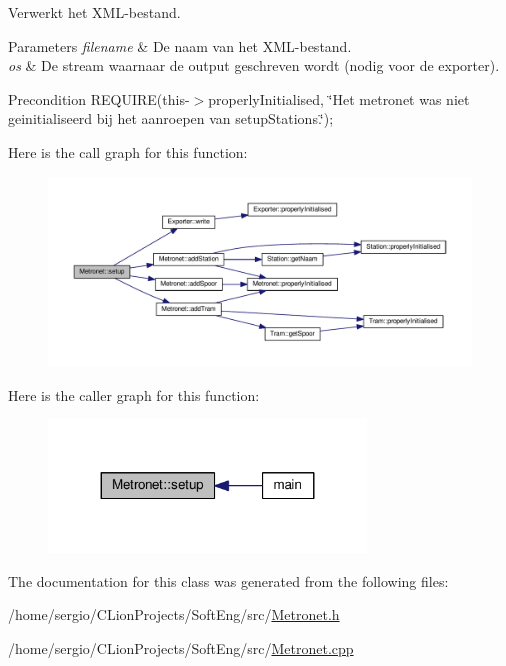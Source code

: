 Verwerkt het X\+M\+L-\/bestand. 


\begin{DoxyParams}{Parameters}
{\em filename} & De naam van het X\+M\+L-\/bestand. \\
\hline
{\em os} & De stream waarnaar de output geschreven wordt (nodig voor de exporter). \\
\hline
\end{DoxyParams}
\begin{DoxyPrecond}{Precondition}
R\+E\+Q\+U\+I\+RE(this-\/$>$properly\+Initialised, \char`\"{}\+Het metronet was niet geinitialiseerd bij het aanroepen van setup\+Stations.\char`\"{}); 
\end{DoxyPrecond}
Here is the call graph for this function\+:\nopagebreak
\begin{figure}[H]
\begin{center}
\leavevmode
\includegraphics[width=350pt]{class_metronet_ad12d6e52c7f5c23d23e87992b4abc1fa_cgraph}
\end{center}
\end{figure}
Here is the caller graph for this function\+:\nopagebreak
\begin{figure}[H]
\begin{center}
\leavevmode
\includegraphics[width=239pt]{class_metronet_ad12d6e52c7f5c23d23e87992b4abc1fa_icgraph}
\end{center}
\end{figure}


The documentation for this class was generated from the following files\+:\begin{DoxyCompactItemize}
\item 
/home/sergio/\+C\+Lion\+Projects/\+Soft\+Eng/src/\hyperlink{_metronet_8h}{Metronet.\+h}\item 
/home/sergio/\+C\+Lion\+Projects/\+Soft\+Eng/src/\hyperlink{_metronet_8cpp}{Metronet.\+cpp}\end{DoxyCompactItemize}

